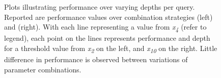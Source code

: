 \begin{figure}[t!]
    \centering
    \caption[Performance over combination stopping strategies]{Plots illustrating performance over varying depths per query. Reported are performance values over combination strategies  (left) and  (right). With each line representing a value from \emph{x\textsubscript{4}} (refer to legend), each point on the lines represents performance and depth for a threshold value from \emph{x\textsubscript{2}} on the left, and \emph{x\textsubscript{10}} on the right. Little difference in performance is observed between variations of parameter combinations.}
    \label{fig:ch7_sim_perf_plots_combo}
\end{figure}

